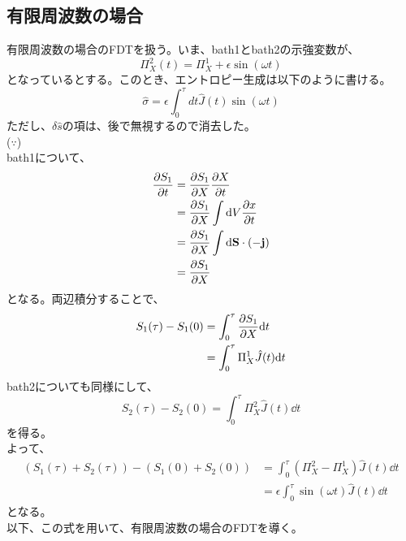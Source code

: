 \documentclass[a4paper,11pt]{jsarticle}
\begin{document}
\subsection{有限周波数の場合}
有限周波数の場合のFDTを扱う。いま、bath1とbath2の示強変数が、
\begin{equation}
    \Pi_X ^2 (t) = \Pi_X ^1 + \epsilon \sin(\omega t)
\end{equation}
となっているとする。このとき、エントロピー生成は以下のように書ける。
\begin{equation}
    \hat{\sigma} = \epsilon \int_{0}^{\tau} dt \hat{J}(t) \sin(\omega t)
\end{equation}
ただし、$\delta \hat{s}$の項は、後で無視するので消去した。\\
($\because$)\\
bath1について、
\begin{align}
    \pdv{S_1}{t} &= \pdv{S_1}{X} \pdv{X}{t}\\
    &= \pdv{S_1}{X} \int \dd V \pdv{x}{t}\\
    &= \pdv{S_1}{X} \int \dd \vb{S} \cdot (\vb{-j})\\
    &= \pdv{S_1}{X}  (\hat{-J}(t))\\
\end{align}
となる。両辺積分することで、
\begin{align}
    S_1(\tau) - S_1(0) &= \int_{0}^{\tau}  \pdv{S_1}{X} (\hat{-J}(t))\dd t\\
    &= \int_{0}^{\tau}  \Pi_X ^1 \hat{J}(t) \dd t
\end{align}
bath2についても同様にして、
\begin{equation}
    S_2(\tau) - S_2(0) = \int_{0}^{\tau}  \Pi_X ^2 \hat{J}(t) \dd t
\end{equation}
を得る。\\
よって、
\begin{align}
    (S_1(\tau) + S_2(\tau)) - (S_1(0) + S_2(0)) &= \int_{0}^{\tau}  (\Pi_X ^2 - \Pi_X ^1) \hat{J}(t) \dd t\\
    &= \epsilon \int_{0}^{\tau}  \sin(\omega t) \hat{J}(t) \dd t
\end{align}
となる。\hfill \qedsymbol
\\
以下、この式を用いて、有限周波数の場合のFDTを導く。\\
\end{document}
